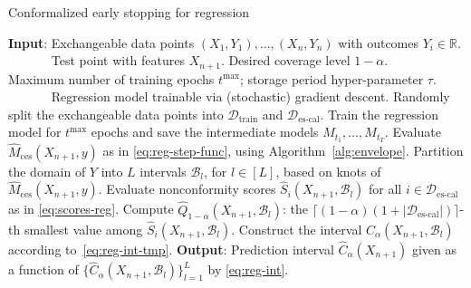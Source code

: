 \begin{algorithm}[H]
    \caption{Conformalized early stopping for regression}
    \label{alg:reg}
    \begin{algorithmic}[1]
        \STATE \textbf{Input}: Exchangeable data points $(X_{1},Y_{1}), \ldots, (X_{n},Y_{n})$ with outcomes $Y_i \in \mathbb{R}$.
        \STATE \textcolor{white}{\textbf{Input}:} Test point with features $X_{n+1}$. Desired coverage level $1-\alpha$.
        \STATE \textcolor{white}{\textbf{Input}:} Maximum number of training epochs $t^{\text{max}}$; storage period hyper-parameter $\tau$.
        \STATE \textcolor{white}{\textbf{Input}:} Regression model trainable via (stochastic) gradient descent.
        \STATE Randomly split the exchangeable data points into $\mathcal{D}_{\text{train}}$ and $\mathcal{D}_{\text{es-cal}}$.
        \STATE Train the regression model for $t^{\text{max}}$ epochs and save the intermediate models $M_{t_1} , \dots, M_{t_T}$.
        \STATE Evaluate $\hat{M}_{\text{ces}}(X_{n+1},y)$ as in \eqref{eq:reg-step-func}, using Algorithm~\ref{alg:envelope}.
        \STATE Partition the domain of $Y$ into $L$ intervals $\mathcal{B}_l$, for $l \in [L]$, based on knots of $\hat{M}_{\text{ces}}(X_{n+1},y)$.
        \STATE Evaluate nonconformity scores $\hat{S}_i(X_{n+1},\mathcal{B}_l)$ for all $i \in \mathcal{D}_{\text{es-cal}}$ as in \eqref{eq:scores-reg}.
        \STATE Compute $\hat{Q}_{1-\alpha}(X_{n+1},\mathcal{B}_l)$: the $\lceil (1-\alpha)(1+|\mathcal{D}_{\text{es-cal}}|) \rceil$-th smallest value among $\hat{S}_i(X_{n+1},\mathcal{B}_l)$.
 \STATE Construct the interval $\hat{C}_{\alpha}(X_{n+1}, \mathcal{B}_l)$ according to~\eqref{eq:reg-int-tmp}.
        \ENDFOR
        \STATE \textbf{Output}: Prediction interval $\hat{C}_{\alpha}(X_{n+1})$ given as a function of $\{\hat{C}_{\alpha}(X_{n+1}, \mathcal{B}_l)\}_{l=1}^{L}$ by \eqref{eq:reg-int}.
    \end{algorithmic}
\end{algorithm}

